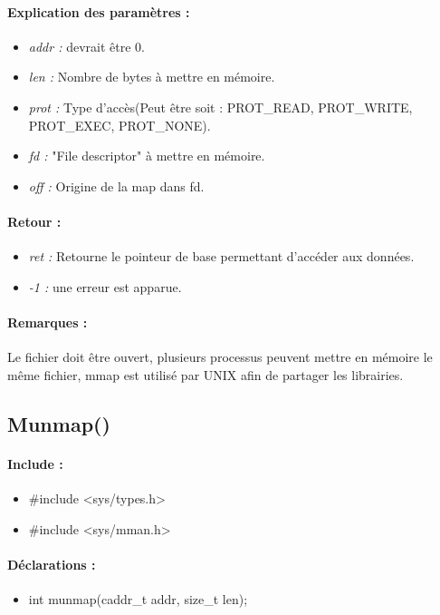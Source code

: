 \documentclass{article}[12pt]
\begin{document}
\paragraph{Explication des paramètres : }
\begin{itemize}
	\item \emph{addr : } devrait être 0.
	\item \emph{len : } Nombre de bytes à mettre en mémoire.
	\item \emph{prot : } Type d'accès(Peut être soit : PROT\_READ, PROT\_WRITE, PROT\_EXEC, PROT\_NONE).
	\item \emph{fd : } "File descriptor" à mettre en mémoire.
	\item \emph{off : } Origine de la map dans fd.
\end{itemize}
\paragraph{Retour : }
\begin{itemize}
	\item \emph{ret : } Retourne le pointeur de base permettant d'accéder aux données.
	\item \emph{-1 : } une erreur est apparue.
\end{itemize}
\paragraph{Remarques : }
Le fichier doit être ouvert, plusieurs processus peuvent mettre en mémoire le même fichier, mmap est utilisé par UNIX afin de partager les librairies.
\subsection{Munmap()}
\paragraph{Include : }
\begin{itemize}
	\item \#include <sys/types.h>
	\item \#include <sys/mman.h>
\end{itemize}
\paragraph{Déclarations : }
\begin{itemize}
	\item int munmap(caddr\_t addr, size\_t len);
\end{itemize}
\end{document}
